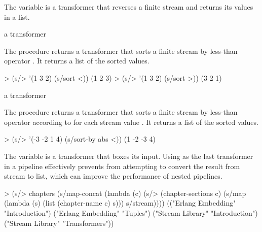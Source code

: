 \begin{variable}
\end{variable}
\antipar

The  variable is a transformer that reverses a finite stream and returns
its values in a list.

\begin{procedure}
\end{procedure}
\returns{} a transformer


The  procedure returns a transformer that sorts a finite stream by less-than
operator . It returns a list of the sorted values.

\codebegin
> (s/> '(1 3 2) (s/sort <))
(1 2 3)
> (s/> '(1 3 2) (s/sort >))
(3 2 1)
\codeend

\begin{procedure}
\end{procedure}
\returns{} a transformer

The  procedure returns a transformer that sorts a finite stream by
less-than operator  according to  for each stream
value . It returns a list of the sorted values.

\codebegin
> (s/> '(-3 -2 1 4) (s/sort-by abs <))
(1 -2 -3 4)
\codeend

\begin{variable}
\end{variable}
\antipar

The  variable is a transformer that boxes its input. Using 
as the last transformer in a pipeline effectively prevents  from attempting to
convert the result from stream to list, which can improve the performance of nested pipelines.

\codebegin
> (s/> chapters
    (s/map-concat
     (lambda (c)
       (s/> (chapter-sections c)
         (s/map (lambda (s) (list (chapter-name c) s)))
         s/stream))))
(("Erlang Embedding" "Introduction")
 ("Erlang Embedding" "Tuples")
 ("Stream Library" "Introduction")
 ("Stream Library" "Transformers"))
\codeend

\begin{variable}
\end{variable}
\antipar

